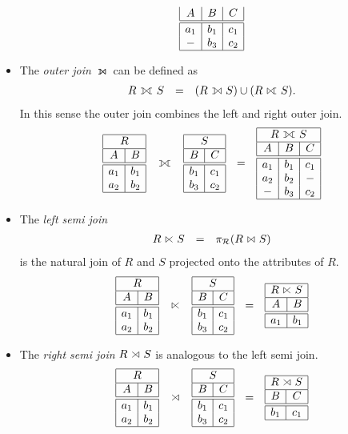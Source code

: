 \begin{itemize}
\[\begin{array}{ccccc}
\begin{array}{|c|c|c|}
	A & B & C \\\hline\hline
	a_1 & b_1 & c_1 \\
	- & b_3 & c_2 \\\hline
	\end{array}
	\end{array}
	\]
\item The \emph{outer join} $\leftouterjoin$ can be defined as
	\[ \begin{array}{rcl}
	R \outerjoin S & = & (R \leftouterjoin S) \cup (R \rightouterjoin S).
	\end{array} \]
	In this sense the outer join combines the left and right outer join.
	\[
	\begin{array}{ccccc}
	\lefttable & \outerjoin & \righttable
	& = &
	\begin{array}{|c|c|c|} \hline
	\multicolumn{3}{|c|}{R \outerjoin S} \\\hline
	A & B & C \\\hline\hline
	a_1 & b_1 & c_1 \\
	a_2 & b_2 & - \\
	- & b_3 & c_2 \\\hline
	\end{array}
	\end{array}
	\]
\item The \emph{left semi join}
	\[ \begin{array}{rcl}
	R \leftsemijoin S & = & \pi_\mc{R}(R \join S)
	\end{array} \]
	is the natural join of $R$ and $S$ projected onto the attributes of $R$.
	\[
	\begin{array}{ccccc}
	\lefttable & \leftsemijoin & \righttable
	& = &
	\begin{array}{|c|c|c|} \hline
	\multicolumn{2}{|c|}{R \leftsemijoin S} \\\hline
	A & B \\\hline\hline
	a_1 & b_1 \\\hline
	\end{array}
	\end{array}
	\]
\item The \emph{right semi join} $R \rightsemijoin S$ is analogous to the left semi join.
	\[
	\begin{array}{ccccc}
	\lefttable & \rightsemijoin & \righttable
	& = &
	\begin{array}{|c|c|c|} \hline
	\multicolumn{2}{|c|}{R \rightsemijoin S} \\\hline
	B & C \\\hline\hline
	b_1 & c_1 \\\hline
	\end{array}
	\end{array}
	\]
\end{itemize}


